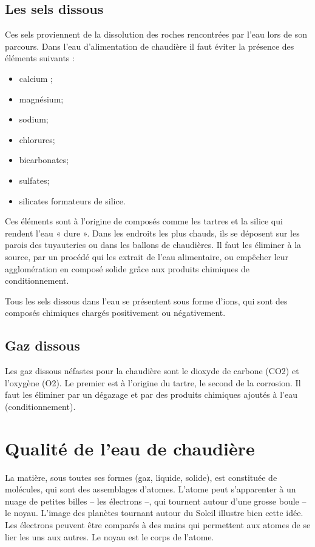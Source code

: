 \subsection{Les sels dissous}

Ces sels proviennent de la dissolution des roches rencontrées par l’eau lors de son parcours.
Dans l’eau d’alimentation de chaudière il faut éviter la présence des éléments suivants :


\begin{itemize}
\item calcium ;
\item magnésium; 
\item sodium;
\item chlorures;
\item bicarbonates;
\item sulfates;
\item silicates formateurs de silice.
\end{itemize}


Ces éléments sont à l’origine de composés comme les tartres et la silice qui rendent l’eau « dure ». Dans les endroits les plus chauds, ils se déposent sur les parois des tuyauteries ou dans les ballons de chaudières. Il faut les éliminer à la source, par un procédé qui les extrait de l’eau alimentaire, ou empêcher leur agglomération en composé solide grâce aux produits chimiques de conditionnement.
\vspace{0.3cm}

Tous les sels dissous dans l’eau se présentent sous forme d’ions, qui sont des composés chimiques chargés positivement ou négativement.



\subsection{	Gaz dissous}

Les gaz dissous néfastes pour la chaudière sont le dioxyde de carbone (CO2) et l’oxygène (O2). Le premier est à l’origine du tartre, le second de la corrosion.
Il faut les éliminer par un dégazage et par des produits chimiques ajoutés à l’eau (conditionnement).


\section{	Qualité de l'eau de chaudière} 


La matière, sous toutes ses formes (gaz, liquide, solide), est constituée de molécules, qui sont des assemblages d’atomes.
L’atome peut s’apparenter à un nuage de petites billes – les électrons –, qui tournent autour d’une grosse boule – le noyau. L’image des planètes tournant autour du Soleil illustre bien cette idée.
Les électrons peuvent être comparés à des mains qui permettent aux atomes de se lier les uns aux autres. Le noyau est le corps de l’atome.
\vspace{0.3cm}

